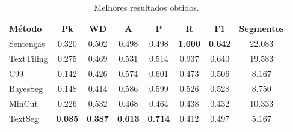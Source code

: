 


	




\begin{table}[!h]
	\centering
\begin{tabular}{|l||c|c|c|c|c|c|c|} 
\hline 
\textbf{M\'{e}todo} & 
\textbf{Pk} & 
\textbf{WD} & 
\textbf{A } & 
\textbf{P } & 
\textbf{R } & 
\textbf{F1} & 
\textbf{Segmentos}\\ \hline

Senten\c{c}as & 0.320 & 0.502 & 0.498 & 0.498 & \textbf{1.000} & \textbf{0.642} & 22.083\\ \hline
TextTiling    & 0.275 & 0.469 & 0.531 & 0.514 & 0.937 & 0.640 & 19.583\\ \hline
C99           & 0.142 & 0.426 & 0.574 & 0.601 & 0.473 & 0.506 & 8.167\\ \hline
BayesSeg      & 0.148 & 0.414 & 0.586 & 0.599 & 0.526 & 0.528 & 8.750\\ \hline
MinCut        & 0.226 & 0.532 & 0.468 & 0.464 & 0.438 & 0.432 & 10.333\\ \hline
TextSeg       & \textbf{0.085} & \textbf{0.387} & \textbf{0.613} & \textbf{0.714} & 0.412 & 0.497 & 5.167\\ \hline
\end{tabular} 

	\caption{Melhores resultados obtidos.}
	\label{tab:configfinal}
\end{table}









